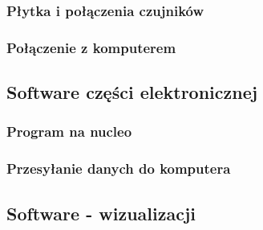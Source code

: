 \documentclass[a4paper,12pt]{article}
\begin{document}
			\subsubsection{Płytka i połączenia czujników}
			\subsubsection{Połączenie z komputerem}
		\subsection{Software części elektronicznej}
			\subsubsection{Program na nucleo}
			\subsubsection{Przesyłanie danych do komputera}
		\subsection{Software - wizualizacji}
	
	
	
	
\end{document}
